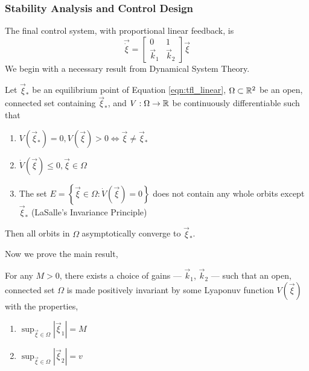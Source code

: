 \documentclass[oneside, 11pt]{book}
\begin{document}
\subsubsection{Stability Analysis and Control Design}\label{sec:sf_stability_analysis}
The final control system, with proportional linear feedback, is
\begin{equation}
    \vec{\dot{\xi}} =   \begin{bmatrix}
                            0 & 1 \\
                            \vec{k}_1 & \vec{k}_2
                        \end{bmatrix}
                        \vec{\xi}
    \label{eqn:tfl_linear}
\end{equation}
We begin with a necessary result from Dynamical System Theory.
\begin{theorem}
    Let $\vec{\xi}_*$ be an equilibrium point of Equation \ref{eqn:tfl_linear}, $\Omega\subset\mathbb{R}^2$ be an open, connected set containing $\vec{\xi}_*$, and $V:\Omega\to\mathbb{R}$ be continuously differentiable such that
    \begin{enumerate}
        \item $V(\vec{\xi}_*) = 0, V(\vec{\xi}) > 0 \Leftrightarrow \vec{\xi}\neq\vec{\xi}_*$
        \item $\dot{V}(\vec{\xi})\leq 0, \vec{\xi}\in\Omega$
        \item The set $E = \left\{ \vec{\xi} \in \Omega : \dot{V}(\vec{\xi}) = 0 \right\}$ does not contain any whole orbits except $\vec{\xi}_*$ (LaSalle's Invariance Principle)
    \end{enumerate}
    Then all orbits in $\Omega$ asymptotically converge to $\vec{\xi}_*$.
    \label{thm:lasalle}
\end{theorem}
Now we prove the main result,
\begin{theorem}
    For any $M>0$, there exists a choice of gains --- $\vec{k}_1$, $\vec{k}_2$ --- such that an open, connected set $\Omega$ is made positively invariant by some Lyaponuv function $V(\vec{\xi})$ with the properties,
    \begin{enumerate}
        \item $\sup_{\vec{\xi}\in\Omega}{\left|\vec{\xi}_1\right|} = M$
        \item $\sup_{\vec{\xi}\in\Omega}{\left|\vec{\xi}_2\right|} = v$
    \end{enumerate}
    \label{thm:sf_stability}
\end{theorem}
\end{document}
